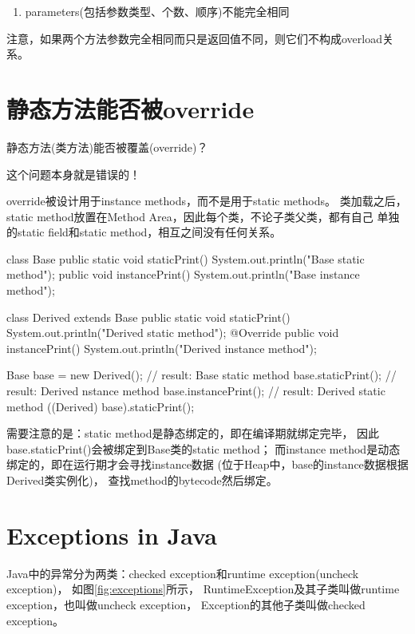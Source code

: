 \documentclass[a4paper,11pt]{article}
\begin{document}
\begin{enumerate}
  \item parameters(包括参数类型、个数、顺序)不能完全相同
\end{enumerate}

注意，如果两个方法参数完全相同而只是返回值不同，则它们不构成overload关系。

\section[静态方法能否被override]{静态方法能否被override}
静态方法(类方法)能否被覆盖(override)？

这个问题本身就是错误的！

override被设计用于instance methods，而不是用于static methods。
类加载之后，static method放置在Method Area，因此每个类，不论子类父类，都有自己
单独的static field和static method，相互之间没有任何关系。

\begin{javacode}
class Base {
  public static void staticPrint() {
    System.out.println("Base static method");
  }
  public void instancePrint() {
    System.out.println("Base instance method");
  }
}

class Derived extends Base {
  public static void staticPrint() {
    System.out.println("Derived static method");
  }
  @Override
  public void instancePrint() {
    System.out.println("Derived instance method");
  }
}

Base base = new Derived();
// result: Base static method
base.staticPrint();
// result: Derived nstance method
base.instancePrint();
// result: Derived static method
((Derived) base).staticPrint();
\end{javacode}

需要注意的是：static method是静态绑定的，即在编译期就绑定完毕，
因此base.staticPrint()会被绑定到Base类的static method；
而instance method是动态绑定的，即在运行期才会寻找instance数据
(位于Heap中，base的instance数据根据Derived类实例化)，
查找method的bytecode然后绑定。


\section[Exceptions in Java]{Exceptions in Java}
Java中的异常分为两类：checked exception和runtime exception(uncheck exception)，
如图\ref{fig:exceptions}所示，
RuntimeException及其子类叫做runtime exception，也叫做uncheck exception，
Exception的其他子类叫做checked exception。
\end{document}
